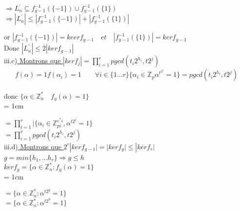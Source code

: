 \documentclass[10pt]{beamer}
\begin{document}
\begin{frame}

$\Longrightarrow L^{'}_n \subseteq f_{g-1}^{-1}(\{-1\})\cup f_{g-1}^{-1}(\{1\})$\\

$ \Longrightarrow |L^{'}_n| \leq |f_{g-1}^{-1}(\{-1\})|+ |f_{g-1}^{-1}(\{1\})|$

or  $|f_{g-1}^{-1}(\{-1\})|= keerf_{g-1} \quad et \quad |f_{g-1}^{-1}(\{1\})| =kerf_{g-1}$\\

Donc $|L^{'}_n | \leq 2|kerf_{g-1}|$\\

iii.c)\underline{ Montrons que $|kerf_j| ={\displaystyle\prod_{i=1}^r pgcd(t_{i}2^{h_{i}}, t2^j)}$}\\

$$
f(\alpha)=1
f(\alpha_i)=1 \qquad \forall i \in \{1...r\}
\{ \alpha_{i} \in \mathbb{Z}_p  \alpha^{t^{2^{j}}}=1\} = pgcd(t_{i}2^{h_{i}}, t2^j)
$$\\
donc $ \{\alpha \in \mathbb{Z}_n^* \quad f_{g}(\alpha)=1 \}$
\\ \parindent = 1cm

$ = {\displaystyle\prod_{i=1}^r | \{\alpha_i \in \mathbb{Z}_{pi}^{e^{*}i} , \alpha ^{t2^{j}}=1\}}$\\
$= {\displaystyle\prod_{i=1}^r pgcd(t_{i}2^{h_{i}}, t2^j)}$\\


iii.d)\underline{ Montrons que $ 2^r|ker f_{g-1}\mid = \mid ker f_g\mid \leq |kerf_r|$}\\

 $g = min \{ h_1,...h_r\} \Longrightarrow g\leq h$\\

$ ker f_g = \{ \alpha \in \mathbb{Z}_n^* : f_g (\alpha) =1 \}$\\ \parindent = 1cm

$ = \{ \alpha \in \mathbb{Z}_n^* : \alpha^{t2^g}=1 \}$\\

$ = \{ \alpha \in \mathbb{Z}_n^* :\alpha^{t2^h}=1 \}$\\



\end{frame}
\end{document}
